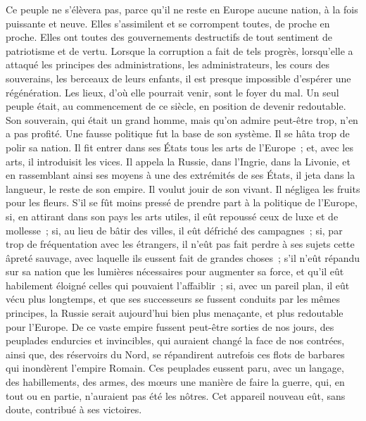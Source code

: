 \documentclass[french,twoside]{book} %
\begin{document}
Ce peuple ne s’élèvera pas, parce qu’il ne reste en Europe aucune nation, à la fois puissante et neuve. Elles s’assimilent et se corrompent toutes, de proche en proche. Elles ont toutes des gouvernements destructifs de tout sentiment de patriotisme et de vertu. Lorsque la corruption a fait de tels progrès, lorsqu’elle a attaqué les principes des administrations, les administrateurs, les cours des souverains, les berceaux de leurs enfants, il est presque impossible d’espérer une régénération. Les lieux, d’où elle pourrait venir, sont le foyer du mal. Un seul peuple était, au commencement de ce siècle, en position de devenir redoutable. Son souverain, qui était un grand homme, mais qu’on admire peut-être trop, n’en a pas profité. Une fausse politique fut la base de son système. Il se hâta trop de polir sa nation. Il fit entrer dans ses États tous les arts de l’Europe ; et, avec les arts, il introduisit les vices. Il appela la Russie, dans l’Ingrie, dans la Livonie, et en rassemblant ainsi ses moyens à une des extrémités de ses États, il jeta dans la langueur, le reste de son empire. Il voulut jouir de son vivant. Il négligea les fruits pour les fleurs. S’il se fût moins pressé de prendre part à la politique de l’Europe, si, en attirant dans son pays les arts utiles, il eût repoussé ceux de luxe et de mollesse ; si, au lieu de bâtir des villes, il eût défriché des campagnes ; si, par trop de fréquentation avec les étrangers, il n’eût pas fait perdre à ses sujets cette âpreté sauvage, avec laquelle ils eussent fait de grandes choses ; s’il n’eût répandu sur sa nation que les lumières nécessaires pour augmenter sa force, et qu’il eût habilement éloigné celles qui pouvaient l’affaiblir ; si, avec un pareil plan, il eût vécu plus longtemps, et que ses successeurs se fussent conduits par les mêmes principes, la Russie serait aujourd’hui bien plus menaçante, et plus redoutable pour l’Europe. De ce vaste empire fussent peut-être sorties de nos jours, des peuplades endurcies et invincibles, qui auraient changé la face de nos contrées, ainsi que, des réservoirs du Nord, se répandirent autrefois ces flots de barbares qui inondèrent l’empire Romain. Ces peuplades eussent paru, avec un langage, des habillements, des armes, des mœurs une manière de faire la guerre, qui, en tout ou en partie, n’auraient pas été les nôtres. Cet appareil nouveau eût, sans doute, contribué à ses victoires.\par
\end{document}

